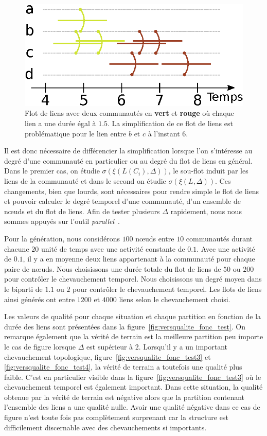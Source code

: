 \begin{figure}
\centering
	\includegraphics[width=0.65\linewidth]{img/Qualite/inter_flot.eps}
\caption{Flot de liens avec deux communautés en \textcolor{olivegreen}{\textbf{vert}} et  \textcolor{briquered}{\textbf{rouge}} où chaque lien a une durée égal à $1.5$.
La simplification de ce flot de liens est problématique pour le lien entre $b$ et $c$ à l'instant $6$.}
\label{fig:qualite_simplification}
\end{figure}

Il est donc nécessaire de différencier la simplification lorsque l'on s'intéresse au degré d'une communauté en particulier ou au degré du flot de liens en général.
Dans le premier cas, on étudie $\sigma(\xi(L(C_i),\Delta))$, le sou-flot induit par les liens de la communauté et dans le second on étudie $\sigma(\xi(L,\Delta))$.
Ces changements, bien que lourds, sont nécessaires pour rendre simple le flot de liens et pouvoir calculer le degré temporel d'une communauté, d'un ensemble de n\oe uds et du flot de liens.
Afin de tester plusieurs $\Delta$ rapidement, nous nous sommes appuyés sur l'outil \emph{parallel}~\cite{Tange2011a}.


\bigskip
Pour la génération, nous considérons $100$ n\oe uds entre $10$ communautés durant chacune $20$ unité de temps avec une activité constante de $0.1$.
Avec une activité de $0.1$, il y a en moyenne deux liens appartenant à la communauté pour chaque paire de n\oe uds.
Nous choisissons une durée totale du flot de liens de $50$ ou $200$ pour contrôler le chevauchement temporel.
Nous choisissons un degré moyen dans le biparti de $1.1$ ou $2$ pour contrôler le chevauchement temporel.
Les flots de liens ainsi générés ont entre $1 200$ et $4 000$ liens selon le chevauchement choisi.

Les valeurs de qualité pour chaque situation et chaque partition en fonction de la durée des liens sont présentées dans la figure~\ref{fig:versqualite_fonc_test}.
On remarque également que la vérité de terrain est la meilleure partition peu importe le cas de figure lorsque $\Delta$ est supérieur à 2.
Lorsqu'il y a un important chevauchement topologique, figure~\ref{fig:versqualite_fonc_test3} et \ref{fig:versqualite_fonc_test4}, la vérité de terrain a toutefois une qualité plus faible.
C'est en particulier visible dans la figure~\ref{fig:versqualite_fonc_test3} où le chevauchement temporel est également important.
Dans cette situation, la qualité obtenue par la vérité de terrain est négative alors que la partition contenant l'ensemble des liens a une qualité nulle.
Avoir une qualité négative dans ce cas de figure n'est toute fois pas complètement surprenant car la structure est difficilement discernable avec des chevauchements si importants.

